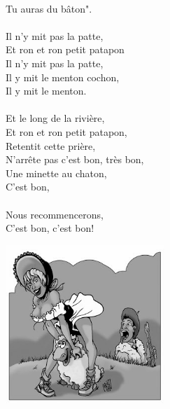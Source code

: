 {\\Tu auras du bâton".
\\\\Il n'y mit pas la patte,
\\Et ron et ron petit patapon
\\Il n'y mit pas la patte,
\\Il y mit le menton cochon,
\\Il y mit le menton.
\\\\Et le long de la rivière,
\\Et ron et ron petit patapon,
\\Retentit cette prière,
\\N'arrête pas c'est bon, très bon,
\\Une minette au chaton,
\\C'est bon,
\\\\Nous recommencerons, 
\\C'est bon, c'est bon!
\begin{center}
\includegraphics[width=0.45\textwidth]{images/bergere.jpg}
\end{center}
}

\breakpage